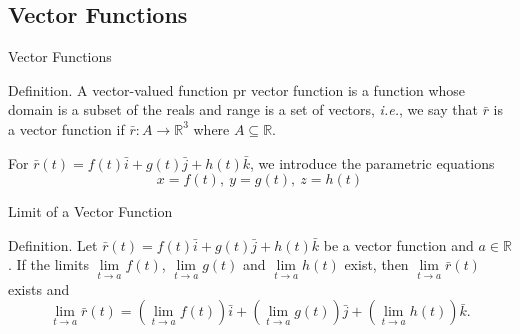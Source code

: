 \documentclass{beamer}
\begin{document}
    \subsection{Vector Functions}
    \begin{frame}[t]{Vector Functions}
        \begin{block}
            \par \textcolor{yy}{Definition.} A \textcolor{yy}{vector-valued function} pr \textcolor{yy}{vector function} is a function whose domain is a subset of the reals and range is a set of vectors, \textit{i.e.}, we say that $\bar{r}$ is a \textcolor{yy}{vector function} if $\bar{r}: A \to \mathbb{R}^3$ where $A \subseteq \mathbb{R}$.
        \end{block}

        \phantom{zjy}
        
        \par For $\bar{r} (t) = f(t) \bar{i} + g(t) \bar{j} + h(t) \bar{k}$, we introduce the parametric equations 
        \begin{equation*}
            x = f(t),\ y = g(t),\ z = h(t) 
        \end{equation*}

        \begin{block}{Limit of a Vector Function}
            \par \textcolor{yy}{Definition.} Let $\bar{r}(t) = f(t) \bar{i} + g(t) \bar{j} + h(t) \bar{k}$ be a vector function and $a \in \mathbb{R}$. If the limits $\lim\limits_{t \to a}f(t)$, $\lim\limits_{t \to a}g(t)$ and $\lim\limits_{t \to a}h(t)$ exist, then $\lim\limits_{t \to a} \bar{r} (t)$ exists and 
            \begin{equation*}
                \lim _{t \rightarrow a} \bar{r}(t)=\left(\lim _{t \rightarrow a} f(t)\right) \bar{i}+\left(\lim _{t \rightarrow a} g(t)\right) \bar{j}+\left(\lim _{t \rightarrow a} h(t)\right) \bar{k} .
            \end{equation*}
        \end{block}
    \end{frame}
\end{document}
